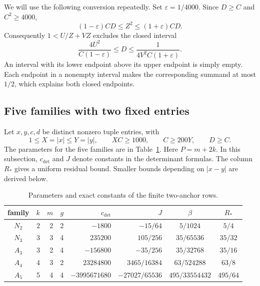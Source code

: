 \documentclass[12pt]{article}
\numberwithin{equation}{section}
\begin{document}
We will use the following conversion repeatedly. Set $\varepsilon=1/4000$.
Since $D\ge C$ and $C^2\ge4000$,
\begin{equation*}
 (1-\varepsilon)CD\le Z^2\le(1+\varepsilon)CD.
\end{equation*}
Consequently $1<U/Z+VZ$ excludes the closed interval
\begin{equation}\label{eq:ff-window}
 \frac{4U^2}{C(1-\varepsilon)}\le D\le
 \frac{1}{4V^2C(1+\varepsilon)}.
\end{equation}
An interval with its lower endpoint above its upper endpoint is simply
empty. Each endpoint in a nonempty interval makes the corresponding
summand at most $1/2$, which explains both closed endpoints.

\subsection{Five families with two fixed entries}

Let $x,y,c,d$ be distinct nonzero tuple entries, with
\begin{equation}\label{eq:ff-twoguards}
 1\le X=|x|\le Y=|y|,\qquad XC\ge1000,
 \qquad C\ge200Y,\qquad D\ge C.
\end{equation}
The parameters for the five families are in Table~\ref{tab:ff-parameters}.
Here $P=m+2k$. In this subsection, $c_{\mathrm{det}}$ and $J$ denote constants in the determinant formulas. The column $R_*$ gives a uniform residual bound. Smaller bounds depending on $|x-y|$ are derived below.

\begin{table}[ht]\centering\small
\begin{tabular}{c|rrr|r|r|c|c}
 family&$k$&$m$&$g$&$c_{\mathrm{det}}$&$J$&$\beta$&$R_*$\\ \hline
 $N_2$&2&2&2&$-1800$&$-15/64$&$5/1024$&$5/4$\\
 $N_3$&3&3&4&$235200$&$105/256$&$35/65536$&$35/32$\\
 $A_3$&3&2&4&$-156800$&$-35/256$&$35/32768$&$35/16$\\
 $A_4$&4&3&2&$23284800$&$3465/16384$&$63/524288$&$63/8$\\
 $A_5$&5&4&4&$-3995671680$&$-27027/65536$&$495/33554432$&$495/64$
\end{tabular}
\caption{Parameters and exact constants of the finite two-anchor rows.}
\label{tab:ff-parameters}
\end{table}
\end{document}
